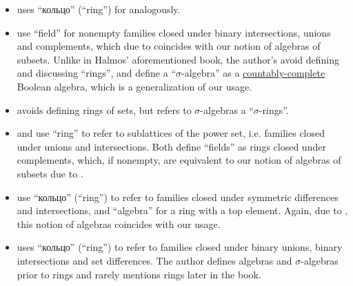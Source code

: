\begin{remark}
\begin{itemize}
    \item {} uses \enquote{кольцо} (\enquote{ring}) for analogously.

    \item {} use \enquote{field} for nonempty families closed under binary intersections, unions and complements, which due to  coincides with our notion of algebras of subsets. Unlike in Halmos' aforementioned book, the author's avoid defining and discussing \enquote{rings}, and define a \enquote{\( \sigma \)-algebra} as a \hyperref[def:countably_complete_lattice]{countably-complete} Boolean algebra, which is a generalization of our usage.

    \item {} avoids defining rings of sets, but refers to \( \sigma \)-algebras a \enquote{\( \sigma \)-rings}.

    \item {} and  use \enquote{ring} to refer to sublattices of the power set, i.e. families closed under unions and intersections. Both define \enquote{fields} as rings closed under complements, which, if nonempty, are equivalent to our notion of algebras of subsets due to .

    \item {} use \enquote{кольцо} (\enquote{ring}) to refer to families closed under symmetric differences and intersections, and \enquote{algebra} for a ring with a top element. Again, due to , this notion of algebras coincides with our usage.

    \item {} uses \enquote{кольцо} (\enquote{ring}) to refer to families closed under binary unions, binary intersections and set differences. The author defines algebras and \( \sigma \)-algebras prior to rings and rarely mentions rings later in the book.
  \end{itemize}
\end{remark}
